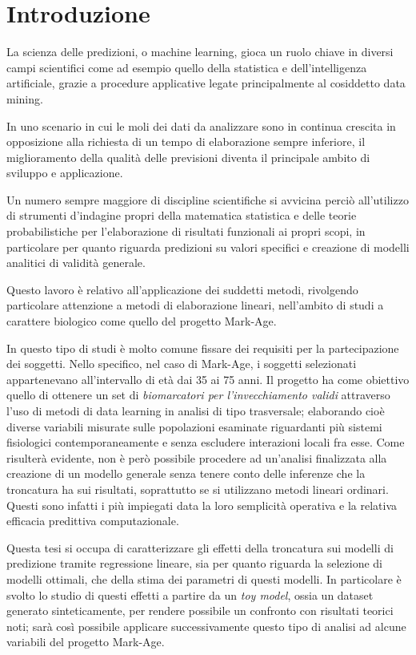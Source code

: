 \documentclass[12pt,openright,twoside,a4paper]{book}
\begin{document}
\frontmatter

\tableofcontents

\chapter{Introduzione}
La scienza delle predizioni, o machine learning, gioca un ruolo chiave in diversi campi scientifici come ad esempio quello della statistica e dell'intelligenza artificiale, grazie a procedure applicative legate principalmente al cosiddetto data mining.

In uno scenario in cui le moli dei dati da analizzare sono in continua crescita in opposizione alla richiesta di un tempo di elaborazione sempre inferiore, il miglioramento della qualità delle previsioni diventa il principale ambito di sviluppo e applicazione.

Un numero sempre maggiore di discipline scientifiche si avvicina perciò all'utilizzo di strumenti d'indagine propri della matematica statistica e delle teorie probabilistiche per l'elaborazione di risultati funzionali ai propri scopi, in particolare per quanto riguarda predizioni su valori specifici e creazione di modelli analitici di validità generale.

Questo lavoro è relativo all'applicazione dei suddetti metodi, rivolgendo particolare attenzione a metodi di elaborazione lineari, nell'ambito di studi a carattere biologico come quello del progetto Mark-Age.

In questo tipo di studi è molto comune fissare dei requisiti per la partecipazione dei soggetti.
Nello specifico, nel caso di Mark-Age, i soggetti selezionati appartenevano all'intervallo di età dai 35 ai 75 anni.
Il progetto ha come obiettivo quello di ottenere un set di \textit{biomarcatori per l'invecchiamento validi} attraverso l'uso di metodi di data learning in analisi di tipo trasversale; elaborando cioè diverse variabili misurate sulle popolazioni esaminate riguardanti più sistemi fisiologici contemporaneamente e senza escludere interazioni locali fra esse.
Come risulterà evidente, non è però possibile procedere ad un'analisi finalizzata alla creazione di un modello generale senza tenere conto delle inferenze che la troncatura ha sui risultati, soprattutto se si utilizzano metodi lineari ordinari. 
Questi sono infatti i più impiegati data la loro semplicità operativa e la relativa efficacia predittiva computazionale.

Questa tesi si occupa di caratterizzare gli effetti della troncatura sui modelli di predizione tramite regressione lineare, sia per quanto riguarda la selezione di modelli ottimali, che della stima dei parametri di questi modelli.
In particolare è svolto lo studio di questi effetti a partire da un \textit{toy model}, ossia un dataset generato sinteticamente, per rendere possibile un  confronto con risultati teorici noti; sarà così possibile applicare successivamente questo tipo di analisi ad alcune variabili del progetto Mark-Age.
\end{document}
